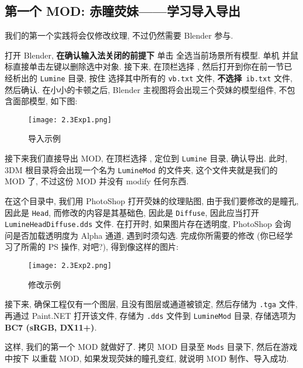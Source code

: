         \subsection{第一个 MOD: 赤瞳荧妹——学习导入导出}
            \par 我们的第一个实践将会仅修改纹理, 不过仍然需要 Blender 参与.
            \par 打开 Blender, \textbf{在确认输入法关闭的前提下} 单击  全选当前场景所有模型. 单机  并鼠标直接单击左键以删除选中对象. 接下来, 在顶栏选择 , 然后打开到你在前一节已经析出的 \texttt{Lumine} 目录, 按住  选择其中所有的 \texttt{vb.txt} 文件, \textbf{不选择}\ \texttt{ib.txt} 文件, 然后确认. 在小小的卡顿之后, Blender 主视图将会出现三个荧妹的模型组件, 不包含面部模型, 如下图:
                \begin{figure}[H]
                    \centering
                    \texttt{[image: 2.3Exp1.png]}
                    \caption{导入示例}
                \end{figure}
            \par 接下来我们直接导出 MOD, 在顶栏选择 , 定位到 \texttt{Lumine} 目录, 确认导出. 此时, 3DM 根目录将会出现一个名为 \texttt{LumineMod} 的文件夹, 这个文件夹就是我们的 MOD 了, 不过这份 MOD 并没有 modify 任何东西. 
            \par 在这个目录中, 我们用 PhotoShop 打开荧妹的纹理贴图, 由于我们要修改的是瞳孔, 因此是 \texttt{Head}, 而修改的内容是其基础色, 因此是 \texttt{Diffuse}, 因此应当打开 \texttt{LumineHeadDiffuse.dds} 文件. 在打开时, 如果图片存在透明度, PhotoShop 会询问是否加载透明度为 Alpha 通道, 遇到时须勾选. 完成你所需要的修改 (你已经学习了所需的 PS 操作, 对吧?), 得到像这样的图片:
                \begin{figure}[H]
                    \centering
                    \texttt{[image: 2.3Exp2.png]}
                    \caption{修改示例}
                \end{figure}
            \par 接下来, 确保工程仅有一个图层, 且没有图层或通道被锁定, 然后存储为 \texttt{.tga} 文件, 再通过 Paint.NET 打开该文件, 存储为 \texttt{.dds} 文件到 \texttt{LumineMod} 目录, 存储选项为 \textbf{BC7 (sRGB, DX11+)}.
            \par 这样, 我们的第一个 MOD 就做好了. 拷贝 MOD 目录至 \texttt{Mods} 目录下, 然后在游戏中按下  以重载 MOD, 如果发现荧妹的瞳孔变红, 就说明 MOD 制作、导入成功.
            
